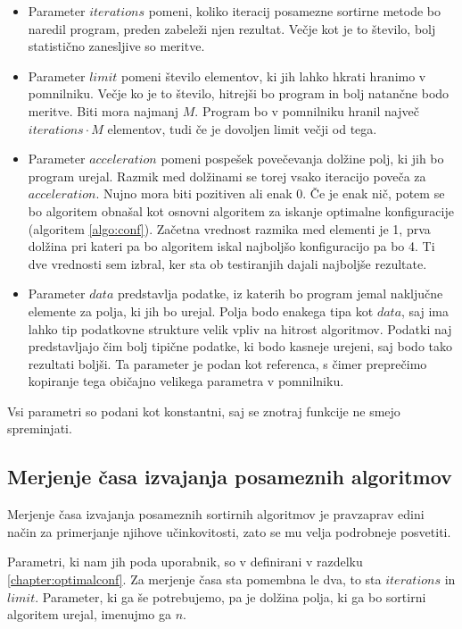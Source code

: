 \documentclass[a4paper,oneside,12pt]{article}
\begin{document}
\begin{itemize}
  \item Parameter $iterations$ pomeni, koliko iteracij posamezne sortirne metode bo naredil
    program, preden zabeleži njen rezultat. Večje kot je to število, bolj statistično
    zanesljive so meritve.
  \item Parameter $limit$ pomeni število elementov, ki jih lahko hkrati hranimo v pomnilniku.
    Večje ko je to število, hitrejši bo program in bolj natančne bodo meritve. Biti mora najmanj $M$. Program bo v
    pomnilniku hranil največ $iterations \cdot M$ elementov, tudi če je dovoljen limit večji od
    tega.
  \item Parameter $acceleration$ pomeni pospešek povečevanja dolžine polj, ki jih bo
    program urejal. Razmik med dolžinami se torej vsako iteracijo poveča za
    $acceleration$. Nujno mora biti pozitiven ali enak $0$. Če je enak nič, potem se bo
    algoritem obnašal kot osnovni algoritem za iskanje optimalne konfiguracije 
    (algoritem \ref{algo:conf}). Začetna vrednost razmika med elementi je 1, prva dolžina
    pri kateri pa bo algoritem iskal najboljšo konfiguracijo pa bo 4. Ti dve vrednosti sem
    izbral, ker sta ob testiranjih dajali najboljše rezultate.
  \item Parameter $data$ predstavlja podatke, iz katerih bo program jemal naključne
    elemente za polja, ki jih bo urejal. Polja bodo enakega tipa kot $data$, saj ima
    lahko tip podatkovne strukture velik vpliv na hitrost algoritmov. Podatki naj
    predstavljajo čim bolj tipične podatke, ki bodo kasneje urejeni, saj bodo tako
    rezultati boljši. Ta parameter je podan kot referenca, s čimer preprečimo kopiranje
    tega običajno velikega parametra v pomnilniku.
\end{itemize}
Vsi parametri so podani kot konstantni, saj se znotraj funkcije ne smejo spreminjati. 

\subsection{Merjenje časa izvajanja posameznih algoritmov}
Merjenje časa izvajanja posameznih sortirnih algoritmov je pravzaprav edini način za
primerjanje njihove učinkovitosti, zato se mu velja podrobneje posvetiti.

Parametri, ki nam jih poda uporabnik, so v definirani v razdelku
\ref{chapter:optimalconf}. Za merjenje časa sta pomembna le dva, to sta $iterations$ in
$limit$. Parameter, ki ga še potrebujemo, pa je dolžina polja, ki ga bo sortirni algoritem
urejal, imenujmo ga $n$.
\end{document}
